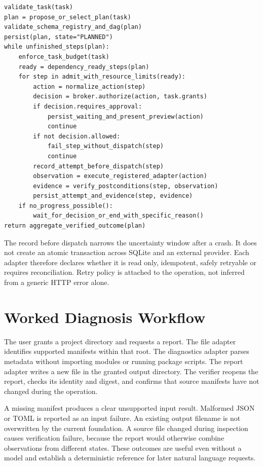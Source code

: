 \begin{lstlisting}[caption={Proposed bounded task execution algorithm}]
validate_task(task)
plan = propose_or_select_plan(task)
validate_schema_registry_and_dag(plan)
persist(plan, state="PLANNED")
while unfinished_steps(plan):
    enforce_task_budget(task)
    ready = dependency_ready_steps(plan)
    for step in admit_with_resource_limits(ready):
        action = normalize_action(step)
        decision = broker.authorize(action, task.grants)
        if decision.requires_approval:
            persist_waiting_and_present_preview(action)
            continue
        if not decision.allowed:
            fail_step_without_dispatch(step)
            continue
        record_attempt_before_dispatch(step)
        observation = execute_registered_adapter(action)
        evidence = verify_postconditions(step, observation)
        persist_attempt_and_evidence(step, evidence)
    if no_progress_possible():
        wait_for_decision_or_end_with_specific_reason()
return aggregate_verified_outcome(plan)
\end{lstlisting}

The record before dispatch narrows the uncertainty window after a crash. It does not create an atomic transaction across SQLite and an external provider. Each adapter therefore declares whether it is read only, idempotent, safely retryable or requires reconciliation. Retry policy is attached to the operation, not inferred from a generic HTTP error alone.

\section{Worked Diagnosis Workflow}
The user grants a project directory and requests a report. The file adapter identifies supported manifests within that root. The diagnostics adapter parses metadata without importing modules or running package scripts. The report adapter writes a new file in the granted output directory. The verifier reopens the report, checks its identity and digest, and confirms that source manifests have not changed during the operation.

A missing manifest produces a clear unsupported input result. Malformed JSON or TOML is reported as an input failure. An existing output filename is not overwritten by the current foundation. A source file changed during inspection causes verification failure, because the report would otherwise combine observations from different states. These outcomes are useful even without a model and establish a deterministic reference for later natural language requests.

